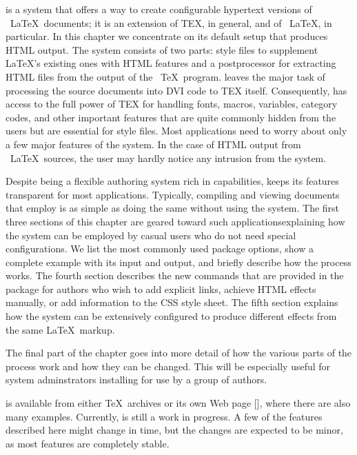 
\ifDOCSTYLErevtex%
  \onecolumngrid
\fi%


\texht is a system that offers a way to create configurable hypertext
versions of \ \LaTeX\  documents; it is an extension of TEX, in general,
and of \ \LaTeX, in particular.  In this chapter we concentrate on its
default setup that produces HTML output.  The system consists of two
parts: style files to supplement \LaTeX 's existing ones with HTML
features and a postprocessor for extracting HTML files from the output of
the \ \TeX\  program. \texht leaves the major task of processing the source
documents into DVI code to TEX itself. Consequently, \texht has access
to the full power of TEX for handling fonts, macros, variables, category
codes, and other important features that are quite commonly hidden from
the users but are essential for style files. Most applications need to
worry about only a few major features of the system. In the case of HTML
output from \ \LaTeX\  sources, the user may hardly notice any intrusion
from the system. 

Despite being a flexible authoring system rich in capabilities, \texht
keeps its features transparent for most applications. Typically,
compiling and viewing documents that employ \texht is as simple as doing
the same without using the system. The first three sections of this
chapter are geared toward such applicationsexplaining how the system can
be employed by casual users who do not need special configurations. We
list the most commonly used package options, show a complete example
with its input and output, and briefly describe how the process works.
The fourth section describes the new commands that are provided in the
package for authors who wish to add explicit links, achieve HTML effects
manually, or add information to the CSS style sheet.  The fifth section
explains how the system can be extensively configured to produce
different effects from the same \LaTeX\ markup. 

The final part of the chapter goes into more detail of how the various
parts of the \texht process work and how they can be changed. This will
be especially useful for system adminstrators installing \texht for use
by a group of authors. 

\texht is available from either \TeX\ archives or its own Web page [],
where there are also many examples. Currently, \texht is still a work in
progress. A few of the features described here might change in time, but
the changes are expected to be minor, as most features are completely
stable. 

